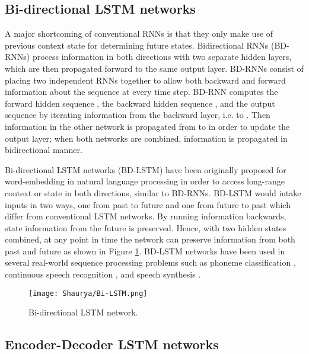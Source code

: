 \documentclass{ieeeaccess}
\begin{document}
  \subsection{Bi-directional LSTM networks }
  
 
A major shortcoming of conventional RNNs is that they 
only  make use of previous context state for determining future states. Bidirectional
RNNs (BD-RNNs) \cite{schuster1997bidirectional}  process information in both
directions with two separate hidden layers, which are then
propagated forward to the same output layer. BD-RNNs  consist of  placing two independent RNNs together to allow  both backward and forward information about the sequence at every time step. BD-RNN computes the forward hidden sequence , the backward hidden sequence , and the output sequence  by iterating information from the backward layer, i.e.  to . Then information in the other network is propagated  from  to   in order to update the output layer; when  both networks are combined, information is propagated in bidirectional manner.


Bi-directional LSTM networks (BD-LSTM)  \cite{graves2005framewise} have been originally proposed for \textcolor{black}{word}-embedding in natural language processing in order to access long-range context or state in both  directions, similar to BD-RNNs.  
BD-LSTM would intake inputs in two ways, one from past to future and one from future to past which differ from conventional LSTM networks.  By running information backwards, state information from the future is preserved. Hence, with two hidden states combined, \textcolor{black}{at} any point in time the network can preserve information from both past and future as shown in Figure \ref{fig:BDLSTM}.
BD-LSTM networks have been used in several real-world sequence processing problems such as phoneme classification
\cite{graves2005framewise}, continuous speech recognition \cite{Fan2014TTSSW}, and speech synthesis \cite{graves2013hybrid}.
 
 
 
 \begin{figure}[htbp!]
  \begin{center}  
   \texttt{[image: Shaurya/Bi-LSTM.png]} \\
    \caption{ Bi-directional LSTM network.}
\label{fig:BDLSTM}
  \end{center}
\end{figure}
 
 \subsection{Encoder-Decoder LSTM networks} 
  
\end{document}
